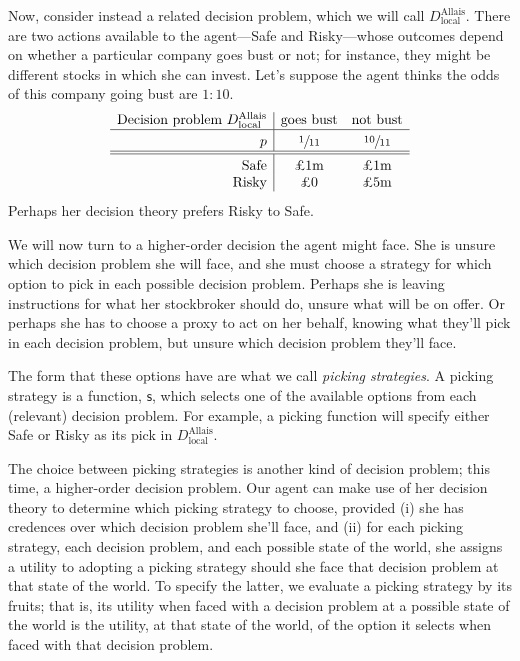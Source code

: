 \documentclass[a4paper,final]{article}
\newcommand\Tstrut{\rule{0pt}{2.6ex}}       %
\newcommand\Bstrut{\rule[-0.9ex]{0pt}{0pt}} %
\newcommand\s{\mathsf{s}}
\newenvironment{CCM rewritten}
{\begingroup\color{blue}} %
{\endgroup}              %
\begin{document}
Now, consider instead a related decision problem, which we will call $D^{\mathrm{Allais}}_{\mathrm{local}}$. There are two actions available to the agent---Safe and Risky---whose outcomes depend on whether a particular company goes bust or not; for instance, they might be different stocks in which she can invest. Let's suppose the agent thinks the odds of this company going bust are $1:10$. 
$$
\begin{array}{r|cc}
	\text{Decision problem } D^{\mathrm{Allais}}_{\mathrm{local}} & \text{goes bust} &  \text{not bust} \Bstrut\\\hline \Tstrut
	p & \sfrac{1}{11} & \sfrac{10}{11}\Bstrut\\\hline\hline \Tstrut
	\text{Safe} &\text{\pounds 1m}&\text{\pounds 1m}                      \\
	\text{Risky} & \text{\pounds 0}&\text{\pounds 5m}
\end{array}
$$
Perhaps her decision theory prefers Risky to Safe. 

We will now turn to a higher-order decision the agent might face.   She is unsure which decision problem she will face, and she must choose a strategy for which option to pick in each possible decision problem. Perhaps she is leaving instructions for what her stockbroker should do, unsure what will be on offer. Or perhaps she has to choose a proxy to act on her behalf, knowing what they'll pick in each decision problem, but unsure which decision problem they'll face. 


The form that these options have are what we call \emph{picking strategies}. 
A picking strategy is a function, $\s$, which selects one of the available options from each (relevant) decision problem. 
For example, a picking function will specify either Safe or Risky as its pick in $D^{\mathrm{Allais}}_{\mathrm{local}}$.

The choice between picking strategies is another kind of decision problem; this time, a higher-order decision problem. Our agent can make use of her decision theory to determine which picking strategy to choose, provided (i) she has credences over which decision problem she'll face, and (ii) for each picking strategy, each decision problem, and each possible state of the world, she assigns a utility to adopting a picking strategy should she face that decision problem at that state of the world. To specify the latter, we evaluate a picking strategy by its fruits; that is, its utility when faced with a decision problem at a possible state of the world is the utility, at that state of the world, of the option it selects when faced with that decision problem.
\end{document}
